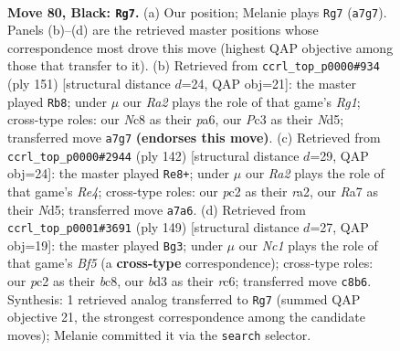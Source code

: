 \documentclass[11pt]{article}
\begin{document}
\clearpage

\begin{figure}[p]\centering
\begin{subfigure}{0.46\textwidth}\centering
\resizebox{\linewidth}{!}{%
\newchessgame
\chessboard[
  setfen={2n5/r7/P1k5/7R/8/2pBK1PP/2P5/8 b - - 0 80},
  showmover=false,
  pgfstyle=straightmove, color=movearrow, markmove={a7-g7}
]}
\caption{}
\end{subfigure}\hfill
\begin{subfigure}{0.46\textwidth}\centering
\resizebox{\linewidth}{!}{%
\newchessgame
\chessboard[
  setfen={6r1/5RP1/P1k5/3n4/3B4/1P1K4/8/8 b - - 4 76},
  showmover=false,
  pgfstyle=straightmove, color=movearrow, markmove={g8-b8}
]}
\caption{}
\end{subfigure}
\\[4pt]
\begin{subfigure}{0.46\textwidth}\centering
\resizebox{\linewidth}{!}{%
\newchessgame
\chessboard[
  setfen={k7/8/2K5/3N4/4Rp1p/6bP/r7/8 w - - 2 72},
  showmover=false,
  pgfstyle=straightmove, color=movearrow, markmove={e4-e8}
]}
\caption{}
\end{subfigure}\hfill
\begin{subfigure}{0.46\textwidth}\centering
\resizebox{\linewidth}{!}{%
\newchessgame
\chessboard[
  setfen={2B5/6p1/P1R5/r7/3K1bPk/8/8/8 b - - 50 75},
  showmover=false,
  pgfstyle=straightmove, color=movearrow, markmove={f4-g3}
]}
\caption{}
\end{subfigure}
\caption{\textbf{Move 80, Black: \texttt{Rg7}.} (a) Our position; Melanie plays \texttt{Rg7} (\texttt{a7g7}). Panels (b)--(d) are the retrieved master positions whose correspondence most drove this move (highest QAP objective among those that transfer to it). (b) Retrieved from \texttt{ccrl\_top\_p0000\#934} (ply 151) [structural distance $d$=24, QAP obj=21]: the master played \texttt{Rb8}; under $\mu$ our \emph{Ra2} plays the role of that game's \emph{Rg1}; cross-type roles: our \emph{N}c8 as their \emph{p}a6, our \emph{P}c3 as their \emph{N}d5; transferred move \texttt{a7g7} \textbf{(endorses this move)}. (c) Retrieved from \texttt{ccrl\_top\_p0000\#2944} (ply 142) [structural distance $d$=29, QAP obj=24]: the master played \texttt{Re8+}; under $\mu$ our \emph{Ra2} plays the role of that game's \emph{Re4}; cross-type roles: our \emph{p}c2 as their \emph{r}a2, our \emph{R}a7 as their \emph{N}d5; transferred move \texttt{a7a6}. (d) Retrieved from \texttt{ccrl\_top\_p0001\#3691} (ply 149) [structural distance $d$=27, QAP obj=19]: the master played \texttt{Bg3}; under $\mu$ our \emph{Nc1} plays the role of that game's \emph{Bf5} (a \textbf{cross-type} correspondence); cross-type roles: our \emph{p}c2 as their \emph{b}c8, our \emph{b}d3 as their \emph{r}c6; transferred move \texttt{c8b6}. Synthesis: 1 retrieved analog transferred to \texttt{Rg7} (summed QAP objective 21, the strongest correspondence among the candidate moves); Melanie committed it via the \texttt{search} selector.}
\label{fig:thought-m159}
\end{figure}
\end{document}
